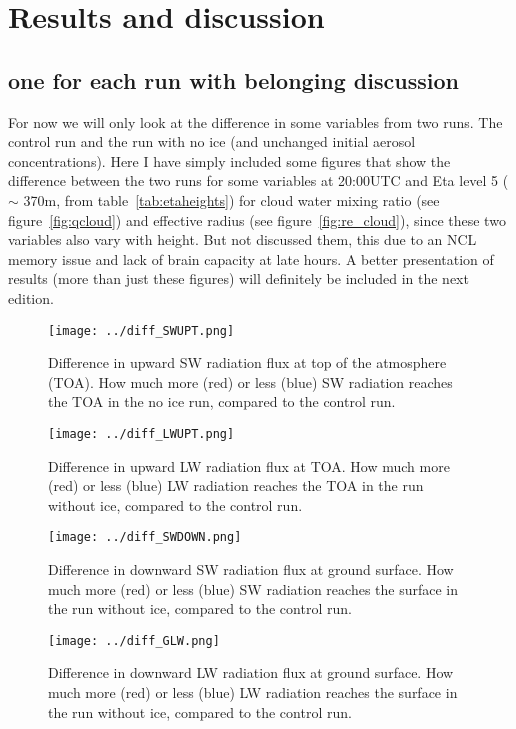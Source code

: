 \chapter{Results and discussion}
\label{chap:results}
\section{one for each run with belonging discussion}
For now we will only look at the difference in some variables from two runs. The control run and the run with no ice (and unchanged initial aerosol concentrations).
Here I have simply included some figures that show the difference between the two runs for some variables at 20:00UTC and Eta level 5 ($\sim$ 370m, from table~\ref{tab:etaheights}) for cloud water mixing ratio (see figure~\ref{fig:qcloud}) and effective radius (see figure~\ref{fig:re_cloud}), since these two variables also vary with height. But not discussed them, this due to an NCL memory issue and lack of brain capacity at late hours. A better presentation of results (more than just these figures) will definitely be included in the next edition.

\begin{figure}
\centering
\texttt{[image: ../diff\_SWUPT.png]}
\caption{Difference in upward SW radiation flux at top of the atmosphere (TOA). How much more (red) or less (blue) SW radiation reaches the TOA in the no ice run, compared to the control run.}
\label{fig:swupt}
\end{figure}

\begin{figure}
\centering
\texttt{[image: ../diff\_LWUPT.png]}
\caption{Difference in upward LW radiation flux at TOA. How much more (red) or less (blue) LW radiation reaches the TOA in the run without ice, compared to the control run.}
\label{fig:lwupt}
\end{figure}

\begin{figure}
\centering
\texttt{[image: ../diff\_SWDOWN.png]}
\caption{Difference in downward SW radiation flux at ground surface. How much more (red) or less (blue) SW radiation reaches the surface in the run without ice, compared to the control run.}
\label{fig:swdown}
\end{figure}

\begin{figure}
\centering
\texttt{[image: ../diff\_GLW.png]}
\caption{Difference in downward LW radiation flux at ground surface. How much more (red) or less (blue) LW radiation reaches the surface in the run without ice, compared to the control run.}
\label{fig:glw}
\end{figure}

